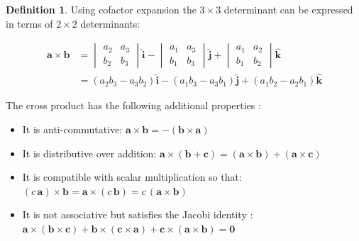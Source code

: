 \documentclass{article}
\theoremstyle{definition}
\newtheorem{definition}{Definition}[section]
\begin{document}
\begin{definition}
\bigskip
\noindent
Using cofactor expansion the $3 \times 3$ determinant can be 
expressed in terms of $2 \times 2$ determinants:

\bigskip
\begin{equation*}
\begin{aligned}
\mathbf {a\times b} 
&= {\begin{vmatrix}
     a_{2} & a_{3} \\
     b_{2} & b_{3}
    \end{vmatrix}}
    \mathbf{\hat{i}} - 
    {\begin{vmatrix}
      a_{1} & a_{3} \\
      b_{1} & b_{3}
     \end{vmatrix}}
    \mathbf{\hat{j}} +
    {\begin{vmatrix}
      a_{1} & a_{2} \\
      b_{1} & b_{2}
     \end{vmatrix}}
     \mathbf{\hat{k}} \\
&= (a_{2}b_{3} - a_{3}b_{2}) \mathbf{\hat{i}} - 
   (a_{1}b_{3} - a_{3}b_{1}) \mathbf{\hat{j}} +
   (a_{1}b_{2} - a_{2}b_{1}) \mathbf{\hat{k}}
\end{aligned}
\end{equation*}


\bigskip
\noindent
The cross product has the following additional properties \cite{wiki:cross_product}:


\begin{itemize}
\item It is anti-commutative: $\mathbf{a} \times \mathbf{b} 
= - (\mathbf{b} \times \mathbf{a})$


\item It is distributive over addition: $\mathbf{a} \times
(\mathbf{b} + \mathbf{c}) = (\mathbf{a} \times \mathbf{b}) +
(\mathbf{a} \times \mathbf{c})$


\item It is compatible with scalar multiplication so that:
$(c\,\mathbf{a}) \times \mathbf{b} = \mathbf{a} \times
(c\,\mathbf{b}) = c \, (\mathbf{a} \times \mathbf{b})$


\item It is not associative but satisfies the Jacobi identity
\cite{wiki:jacobi_identity}: 
$\mathbf{a} \times (\mathbf{b} \times \mathbf{c}) + 
\mathbf{b} \times (\mathbf{c} \times \mathbf{a}) + 
\mathbf{c} \times (\mathbf{a} \times \mathbf{b}) 
= \mathbf{0}$
\end{itemize}
\end{definition}
\end{document}
